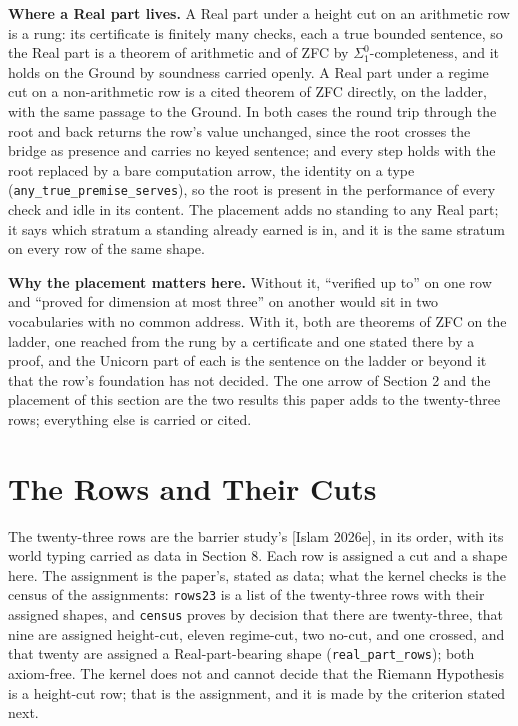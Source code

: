 \documentclass[10pt,twocolumn]{article}
\begin{document}
\textbf{Where a Real part lives.} A Real part under a height cut on an
arithmetic row is a rung: its certificate is finitely many checks, each
a true bounded sentence, so the Real part is a theorem of arithmetic and
of ZFC by \(\Sigma^0_1\)-completeness, and it holds on the Ground by
soundness carried openly. A Real part under a regime cut on a
non-arithmetic row is a cited theorem of ZFC directly, on the ladder,
with the same passage to the Ground. In both cases the round trip
through the root and back returns the row's value unchanged, since the
root crosses the bridge as presence and carries no keyed sentence; and
every step holds with the root replaced by a bare computation arrow, the
identity on a type (\texttt{any\_true\_premise\_serves}), so the root is
present in the performance of every check and idle in its content. The
placement adds no standing to any Real part; it says which stratum a
standing already earned is in, and it is the same stratum on every row
of the same shape.

\textbf{Why the placement matters here.} Without it, ``verified up to''
on one row and ``proved for dimension at most three'' on another would
sit in two vocabularies with no common address. With it, both are
theorems of ZFC on the ladder, one reached from the rung by a
certificate and one stated there by a proof, and the Unicorn part of
each is the sentence on the ladder or beyond it that the row's
foundation has not decided. The one arrow of Section 2 and the placement
of this section are the two results this paper adds to the twenty-three
rows; everything else is carried or cited.

\hypertarget{the-rows-and-their-cuts}{%
\section{The Rows and Their Cuts}\label{the-rows-and-their-cuts}}

The twenty-three rows are the barrier study's {[}Islam 2026e{]}, in its
order, with its world typing carried as data in Section 8. Each row is
assigned a cut and a shape here. The assignment is the paper's, stated
as data; what the kernel checks is the census of the assignments:
\texttt{rows23} is a list of the twenty-three rows with their assigned
shapes, and \texttt{census} proves by decision that there are
twenty-three, that nine are assigned height-cut, eleven regime-cut, two
no-cut, and one crossed, and that twenty are assigned a
Real-part-bearing shape (\texttt{real\_part\_rows}); both axiom-free.
The kernel does not and cannot decide that the Riemann Hypothesis is a
height-cut row; that is the assignment, and it is made by the criterion
stated next.
\end{document}
